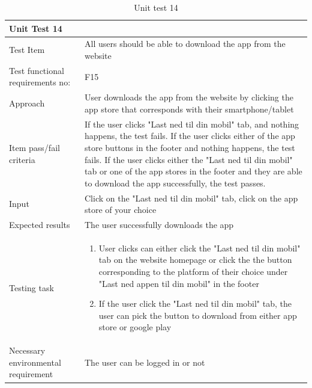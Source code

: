 \begin{table}[H]
\begin{tabular}{ | L{0.25\linewidth} | L{0.75\linewidth} | } 
 \hline {}
 Unit Test 14 &  \\
 \hline
 Test Item & All users should be able to download the app from the website\\
 \hline
 Test functional requirements no: & F15
 \\
 \hline
 Approach & User downloads the app from the website by clicking the app store that corresponds with their smartphone/tablet\\
  \hline
 Item pass/fail criteria & If the user clicks "Last ned til din mobil" tab, and nothing happens, the test fails. If the user clicks either of the app store buttons in the footer and nothing happens, the test fails. If the user clicks either the "Last ned til din mobil" tab or one of the app stores in the footer and they are able to download the app successfully, the test passes.\\
 \hline
 Input & Click on the "Last ned til din mobil" tab, click on the app store of your choice\\ 
 \hline
 Expected results & The user successfully downloads the app\\
  \hline
Testing task &
    \vspace{-5mm}
    \begin{enumerate}[noitemsep]
  \item User clicks can either click the "Last ned til din mobil" tab on the website homepage or click the the button corresponding to the platform of their choice under "Last ned appen til din mobil" in the footer
  \item If the user click the "Last ned til din mobil" tab, the user can pick the button to download from either app store or google play
   \end{enumerate}\\
 \hline
 Necessary environmental requirement & The user can be logged in or not\\
 \hline
\end{tabular}
\caption{Unit test 14}
\end{table}

